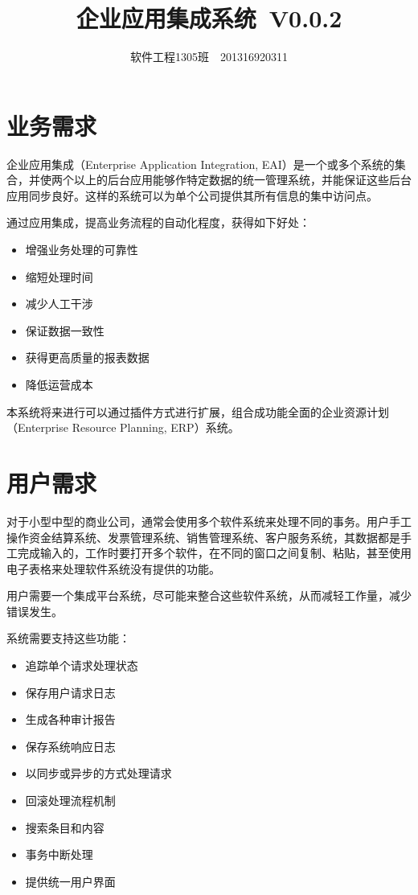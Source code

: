 \documentclass[cs4size,a4paper,nofonts]{ctexart}
\def\tjf{{\tt{田劲锋}}}
\def\titlec{企业应用集成系统}
\def\version{V0.0.2}
\begin{document}

\title{\bf\titlec~\version}
\author{软件工程1305班~\quad\tjf\quad~201316920311}
\maketitle

\section{业务需求}

企业应用集成（Enterprise Application Integration, EAI）是一个或多个系统的集合，并使两个以上的后台应用能够作特定数据的统一管理系统，并能保证这些后台应用同步良好。这样的系统可以为单个公司提供其所有信息的集中访问点。

通过应用集成，提高业务流程的自动化程度，获得如下好处：

\begin{itemize}
\item 增强业务处理的可靠性
\item 缩短处理时间
\item 减少人工干涉
\item 保证数据一致性
\item 获得更高质量的报表数据
\item 降低运营成本
\end{itemize}

本系统将来进行可以通过插件方式进行扩展，组合成功能全面的企业资源计划（Enterprise Resource Planning, ERP）系统。

\section{用户需求}

对于小型中型的商业公司，通常会使用多个软件系统来处理不同的事务。用户手工操作资金结算系统、发票管理系统、销售管理系统、客户服务系统，其数据都是手工完成输入的，工作时要打开多个软件，在不同的窗口之间复制、粘贴，甚至使用电子表格来处理软件系统没有提供的功能。

用户需要一个集成平台系统，尽可能来整合这些软件系统，从而减轻工作量，减少错误发生。

系统需要支持这些功能：

\begin{itemize}
\item 追踪单个请求处理状态
\item 保存用户请求日志
\item 生成各种审计报告
\item 保存系统响应日志
\item 以同步或异步的方式处理请求
\item 回滚处理流程机制
\item 搜索条目和内容
\item 事务中断处理
\item 提供统一用户界面
\end{itemize}
\end{document}
